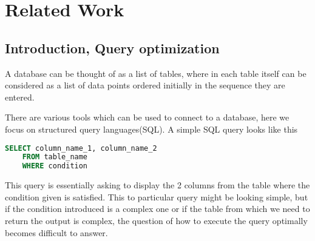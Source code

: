 \chapter{Related Work}
\label{chapter:related_work}
\thispagestyle{myheadings}

\graphicspath{{2_Body/Figures/}}

\section{Introduction, Query optimization}
A database can be thought of as a list of tables, where in each table itself can be considered as a list of data points ordered initially in the sequence they are entered.
\par There are various tools which can be used to connect to a database, here we focus on structured query languages(SQL). A simple SQL query looks like this
\begin{lstlisting}[language=SQL]
    SELECT column_name_1, column_name_2
    FROM table_name
    WHERE condition
\end{lstlisting}
This query is essentially asking to display the 2 columns from the table where the condition given is satisfied. This to particular query might be looking simple, but if the condition introduced is a complex one or if the table from which we need to return the output is complex, the question of how to execute the query optimally becomes difficult to answer.

